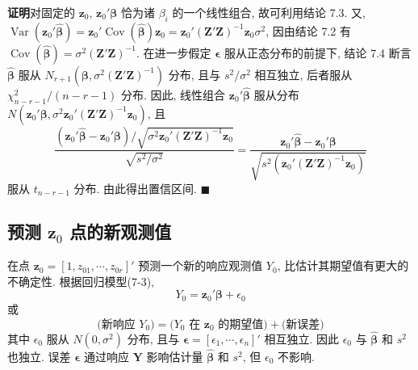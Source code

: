 \noindent\textbf{证明}\quad 对固定的 $\mathbf{z}_0$, $\mathbf{z}_0'\boldsymbol{\beta}$ 恰为诸 $\beta_i$ 的一个线性组合, 故可利用结论 7.3. 又, $\operatorname{Var}(\mathbf{z}_0'\hat{\boldsymbol{\beta}})=\mathbf{z}_0'\operatorname{Cov}(\hat{\boldsymbol{\beta}})\mathbf{z}_0=\mathbf{z}_0'(\mathbf{Z}'\mathbf{Z})^{-1}\mathbf{z}_0\sigma^2$, 因由结论 7.2 有 $\operatorname{Cov}(\hat{\boldsymbol{\beta}})=\sigma^2(\mathbf{Z}'\mathbf{Z})^{-1}$. 在进一步假定 $\boldsymbol{\epsilon}$ 服从正态分布的前提下, 结论 7.4 断言 $\hat{\boldsymbol{\beta}}$ 服从 $N_{r+1}(\boldsymbol{\beta},\sigma^2(\mathbf{Z}'\mathbf{Z})^{-1})$ 分布, 且与 $s^2/\sigma^2$ 相互独立, 后者服从 $\chi^2_{n-r-1}/(n-r-1)$ 分布. 因此, 线性组合 $\mathbf{z}_0'\hat{\boldsymbol{\beta}}$ 服从分布 $N(\mathbf{z}_0'\boldsymbol{\beta},\sigma^2\mathbf{z}_0'(\mathbf{Z}'\mathbf{Z})^{-1}\mathbf{z}_0)$, 且
\[
\frac{(\mathbf{z}_0'\hat{\boldsymbol{\beta}}-\mathbf{z}_0'\boldsymbol{\beta})\Big/\sqrt{\sigma^2\mathbf{z}_0'(\mathbf{Z}'\mathbf{Z})^{-1}\mathbf{z}_0}}{\sqrt{s^2\Big/\sigma^2}}=\frac{\mathbf{z}_0'\hat{\boldsymbol{\beta}}-\mathbf{z}_0'\boldsymbol{\beta}}{\sqrt{s^2\left(\mathbf{z}_0'(\mathbf{Z}'\mathbf{Z})^{-1}\mathbf{z}_0\right)}}
\]
服从 $t_{n-r-1}$ 分布. 由此得出置信区间. \hfill$\blacksquare$

\subsection{\texorpdfstring{预测 $\mathbf{z}_0$ 点的新观测值}{预测 z0 点的新观测值}}

在点 $\mathbf{z}_0=[1,z_{01},\cdots,z_{0r}]'$ 预测一个新的响应观测值 $Y_0$, 比估计其期望值有更大的不确定性. 根据回归模型(7-3),
\[
Y_0=\mathbf{z}_0'\boldsymbol{\beta}+\epsilon_0
\]
或
\[
\text{(新响应 }Y_0\text{)}=\text{(}Y_0\text{ 在 }\mathbf{z}_0\text{ 的期望值)}+\text{(新误差)}
\]
其中 $\epsilon_0$ 服从 $N(0,\sigma^2)$ 分布, 且与 $\boldsymbol{\epsilon}=[\epsilon_1,\cdots,\epsilon_n]'$ 相互独立. 因此 $\epsilon_0$ 与 $\hat{\boldsymbol{\beta}}$ 和 $s^2$ 也独立. 误差 $\boldsymbol{\epsilon}$ 通过响应 $\mathbf{Y}$ 影响估计量 $\hat{\boldsymbol{\beta}}$ 和 $s^2$, 但 $\epsilon_0$ 不影响.

